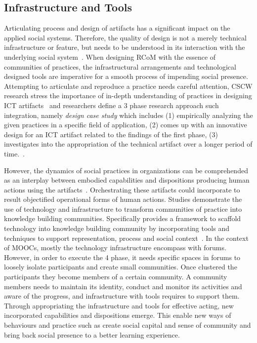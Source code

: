 \documentclass[format=acmsmall, review=false, screen=true]{acmart}
\begin{document}
\subsection{Infrastructure and Tools}
Articulating process and design of artifacts has a significant impact on the applied social systems. Therefore, the quality of design is not a merely technical infrastructure or feature, but needs to be understood in its interaction with the underlying social system~\cite{rohde2009towards}. When designing RCoM with the essence of communities of practices, the infrastructural arrangements and technological designed tools are imperative for a smooth process of impending social presence. Attempting to articulate and reproduce a practice needs careful attention, CSCW research stress the importance of in-depth understanding of practices in designing ICT artifacts~\cite{wulf1995towards} and researchers define a 3 phase research approach such integration, namely \textit{design case study} which includes (1) empirically analyzing the given practices in a specific field of application, (2) comes up with an innovative design for an ICT artifact related to the findings of the first phase, (3) investigates into the appropriation of the technical artifact over a longer period of time.~\cite{wulf2011engaging}.

However, the dynamics of social practices in organizations can be comprehended as an interplay between embodied capabilities and dispositions producing human actions using the artifacts~\cite{wulf1995towards}. Orchestrating these artifacts could incorporate to result objectified operational forms of human actions. Studies demonstrate the use of technology and infrastructure to transform communities of practice into knowledge building communities. Specifically provides a framework to scaffold technology into knowledge building community by incorporating tools and techniques to support representation, process and social context~\cite{hoadley2005using}. In the context of MOOCs, mostly the technology infrastructure encompass with forums. However, in order to execute the 4 phase, it needs specific spaces in forums to loosely isolate participants and create small communities. Once clustered the participants they become members of a certain community. A community members needs to maintain its identity, conduct and monitor its activities and aware of the progress, and infrastructure with tools requires to support them. Through appropriating the infrastructure and tools for effective acting, new incorporated capabilities and dispositions emerge. This enable new ways of behaviours and practice such as create social capital and sense of community and bring back social presence to a better learning experience. 
\end{document}
